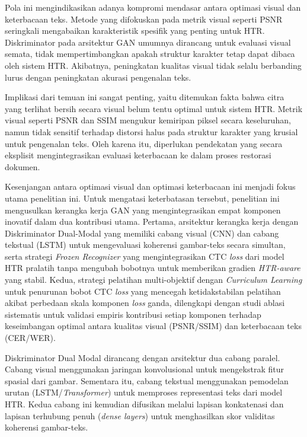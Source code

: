 \documentclass[12pt,a4paper]{article}
\begin{document}
\vspace{0.8em}
Pola ini mengindikasikan adanya kompromi mendasar antara optimasi visual dan keterbacaan teks. Metode yang difokuskan pada metrik visual seperti PSNR seringkali mengabaikan karakteristik spesifik yang penting untuk HTR. Diskriminator pada arsitektur GAN umumnya dirancang untuk evaluasi visual semata, tidak mempertimbangkan apakah struktur karakter tetap dapat dibaca oleh sistem HTR. Akibatnya, peningkatan kualitas visual tidak selalu berbanding lurus dengan peningkatan akurasi pengenalan teks.

\vspace{0.8em}
Implikasi dari temuan ini sangat penting, yaitu ditemukan fakta bahwa  citra yang terlihat bersih secara visual belum tentu optimal untuk sistem HTR. Metrik visual seperti PSNR dan SSIM mengukur kemiripan piksel secara keseluruhan, namun tidak sensitif terhadap distorsi halus pada struktur karakter yang krusial untuk pengenalan teks. Oleh karena itu, diperlukan pendekatan yang secara eksplisit mengintegrasikan evaluasi keterbacaan ke dalam proses restorasi dokumen.

\vspace{0.5cm}  %
Kesenjangan antara optimasi visual dan optimasi keterbacaan ini menjadi fokus utama penelitian ini. Untuk mengatasi keterbatasan tersebut, penelitian ini mengusulkan kerangka kerja GAN yang mengintegrasikan empat komponen inovatif dalam dua kontribusi utama. Pertama, arsitektur kerangka kerja dengan Diskriminator Dual-Modal yang memiliki cabang visual (CNN) dan cabang tekstual (LSTM) untuk mengevaluasi koherensi gambar-teks secara simultan, serta strategi \textit{Frozen Recognizer} yang mengintegrasikan CTC \textit{loss} dari model HTR pralatih tanpa mengubah bobotnya untuk memberikan gradien \textit{HTR-aware} yang stabil. Kedua, strategi pelatihan multi-objektif dengan \textit{Curriculum Learning} untuk penurunan bobot CTC \textit{loss} yang mencegah ketidakstabilan pelatihan akibat perbedaan skala komponen \textit{loss} ganda, dilengkapi dengan studi ablasi sistematis untuk validasi empiris kontribusi setiap komponen terhadap keseimbangan optimal antara kualitas visual (PSNR/SSIM) dan keterbacaan teks (CER/WER).

\vspace{0.8em}
Diskriminator Dual Modal dirancang dengan arsitektur dua cabang paralel. Cabang visual menggunakan jaringan konvolusional untuk mengekstrak fitur spasial dari gambar. Sementara itu, cabang tekstual menggunakan pemodelan urutan (LSTM/\textit{Transformer}) untuk memproses representasi teks dari model HTR. Kedua cabang ini kemudian difusikan melalui lapisan konkatenasi dan lapisan terhubung penuh (\textit{dense layers}) untuk menghasilkan skor validitas koherensi gambar-teks.
\end{document}
